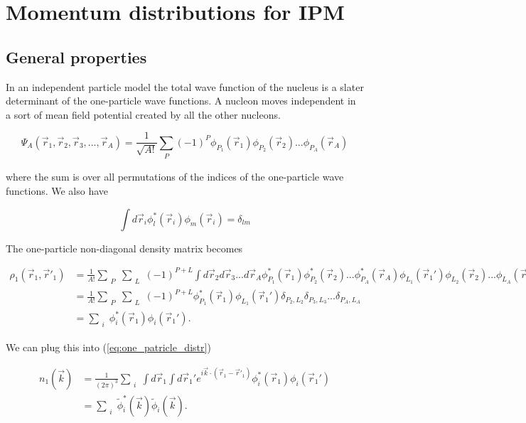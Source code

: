 \documentclass[12pt]{article}
\begin{document}
\section{Momentum distributions for IPM}
\subsection{General properties}

In an independent particle model the total wave function of the nucleus is a slater determinant of the one-particle wave functions. A nucleon moves independent in a sort of mean field potential created by all the other nucleons. 

\begin{equation} \label{eq:slater}
\Psi_A(\vec{r}_1,\vec{r}_2,\vec{r}_3, ... ,\vec{r}_A)= \frac{1}{\sqrt{A!}} \sum_{\substack{P}} 
													  (-1)^P \phi_{P_1}(\vec{r}_1)
													         \phi_{P_2}(\vec{r}_2)...
													         \phi_{P_A}(\vec{r}_A)
\end{equation}

where the sum is over all permutations of the indices of the one-particle wave functions. We also have 

\begin{equation} \label{eq:orthogonality}
\int d\vec{r}_i \phi^*_l(\vec{r}_i)\phi_m(\vec{r}_i) = \delta_{lm}
\end{equation}

The one-particle non-diagonal density matrix becomes

\begin{align}
\rho_1(\vec{r}_1,\vec{r}'_1) & = \frac{1}{A!} 	 \sum_{\substack{P}} \sum_{\substack{L}} (-1)^{P+L} \int d\vec{r}_2 d\vec{r}_3 ... d\vec{r}_A 
\phi^*_{P_1}(\vec{r}_1)\phi^*_{P_2}(\vec{r}_2)...\phi^*_{P_A}(\vec{r}_A)
\phi_{L_1}(\vec{r}_1')\phi_{L_2}(\vec{r}_2)...\phi_{L_A}(\vec{r}_A) \\
&  = \frac{1}{A!} 	 \sum_{\substack{P}} \sum_{\substack{L}} (-1)^{P+L} \phi^*_{P_1}(\vec{r}_1) \phi_{L_1}(\vec{r}_1') 
\delta_{P_2,L_2}\delta_{P_3,L_3}...\delta_{P_A,L_A} \\
& = \sum_{\substack{i}} \phi^*_i(\vec{r}_1) \phi_i(\vec{r}_1').
\end{align}

We can plug this into (\ref{eq:one_patricle_distr})

\begin{align} 
	n_1(\vec{k})&=\frac{1}{(2\pi)^3} \sum_{\substack{i}} \int d\vec{r}_1 \int d\vec{r}_1' e^{i\vec{k}\cdot (\vec{r}_1-\vec{r}'_1)}
	\phi^*_i(\vec{r}_1)\phi_i(\vec{r}_1') \\
	& = \sum_{\substack{i}} \tilde{\phi}^*_i(\vec{k})\tilde{\phi}_i(\vec{k}).
\end{align}
\end{document}
